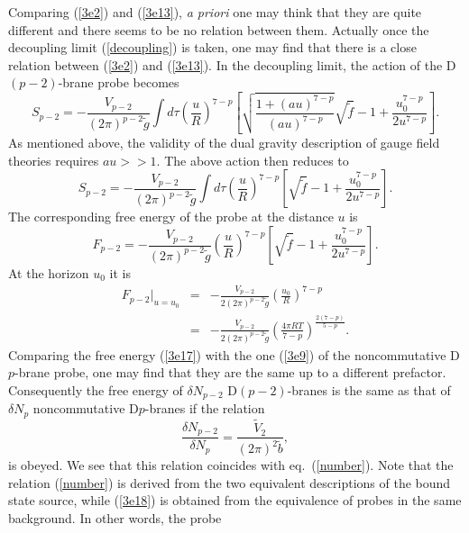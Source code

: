 \documentclass[a4paper,12pt]{article}
\begin{document}
Comparing (\ref{3e2}) and (\ref{3e13}), {\it a priori} one may think that
they are quite different and there seems to be no relation between them.
Actually once the decoupling limit (\ref{decoupling}) is taken, one may find
that there is a close relation between (\ref{3e2}) and (\ref{3e13}). In the
decoupling limit, the action of the D$(p-2)$-brane probe becomes
\begin{equation}
S_{p-2}=-\frac{V_{p-2}}{(2\pi)^{p-2}\tilde{g}}\int d\tau
      \left (\frac{u}{R}\right)^{7-p}\left [
    \sqrt{\frac{1+(au)^{7-p}}{(au)^{7-p}}}\sqrt{\tilde{f}}-1
      +\frac{u_0^{7-p}}{2u^{7-p}}\right ].
\end{equation}
As mentioned above, the validity of the dual gravity description of gauge
field theories requires $au>>1$. The above action then reduces to
\begin{equation}
S_{p-2}= -\frac{V_{p-2}}{(2\pi)^{p-2}\tilde{g}}\int d\tau
      \left (\frac{u}{R}\right)^{7-p}\left [
    \sqrt{ \tilde{f}}-1
      +\frac{u_0^{7-p}}{2u^{7-p}}\right ].
\end{equation}
The corresponding free energy of the probe at the distance $u$ is
\begin{equation}
F_{p-2}= -\frac{V_{p-2}}{(2\pi)^{p-2}\tilde{g}}
      \left (\frac{u}{R}\right)^{7-p}\left [
    \sqrt{ \tilde{f}}-1
      +\frac{u_0^{7-p}}{2u^{7-p}}\right ].
\end{equation}
At the horizon $u_0$ it is
\begin{eqnarray}
F_{p-2}|_{u=u_0} &=&-\frac{V_{p-2}}{2(2\pi)^{p-2}\tilde{g}}
  \left(\frac{u_0}{R} \right)^{7-p}  \nonumber \\
\label{3e17}
    &=& -\frac{V_{p-2}}{2(2\pi)^{p-2}\tilde{g}}
     \left (\frac{4\pi RT}{7-p}\right)^{\frac{2(7-p)}{5-p}}.
\end{eqnarray}
Comparing the free energy (\ref{3e17}) with the one (\ref{3e9}) of the
noncommutative D$p$-brane probe, one may find that they are the same up to a
different prefactor. Consequently the free energy of $\delta N_{p-2}$
D$(p-2)$-branes is the same as that of $\delta N_p$ noncommutative D$p$-branes
if the relation
\begin{equation}
\label{3e18}
\frac{\delta N_{p-2}}{\delta N_p}= \frac{\tilde{V}_2}{(2\pi)^2 \tilde{b}},
\end{equation}
is obeyed. We see that this relation coincides with eq.~(\ref{number}). Note
that the relation (\ref{number}) is derived from the two equivalent
descriptions of the bound state source, while (\ref{3e18}) is obtained from
the equivalence of probes in the same background. In other words, the probe
\end{document}
